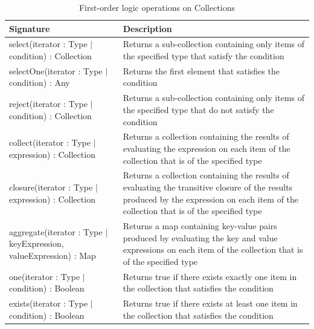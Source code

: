 \begin{longtabu} {|p{6.5cm}|X|}
			
			\caption{First-order logic operations on Collections}
			\label{tab:FirstOrderOperations}\\
			
			\hline
							
			\textbf{Signature} & \textbf{Description} \\\hline

			select(iterator : Type $|$ condition) : Collection & Returns a sub-collection containing only items of the specified type that satisfy the condition \\\hline 

			selectOne(iterator : Type $|$ condition) : Any & Returns the first element that satisfies the condition \\\hline
			
			reject(iterator : Type $|$ condition) : Collection & Returns a sub-collection containing only items of the specified type that do not satisfy the condition \\\hline
			
			collect(iterator : Type $|$ expression) : Collection &  Returns a collection containing the results of evaluating the expression on each item of the collection that is of the specified type \\\hline

                        closure(iterator : Type $|$ expression) : Collection & Returns a collection containing the results of evaluating the transitive closure of the results produced by the expression on each item of the collection that is of the specified type \\\hline

                        aggregate(iterator : Type $|$ keyExpression, valueExpression) : Map & Returns a map containing key-value pairs produced by evaluating the key and value expressions on each item of the collection that is of the specified type \\\hline

			one(iterator : Type $|$ condition) : Boolean & Returns true if there exists exactly one item in the collection that satisfies the condition \\\hline

			exists(iterator : Type $|$ condition) : Boolean & Returns true if there exists at least one item in the collection that satisfies the condition \\\hline
			

\end{longtabu}
